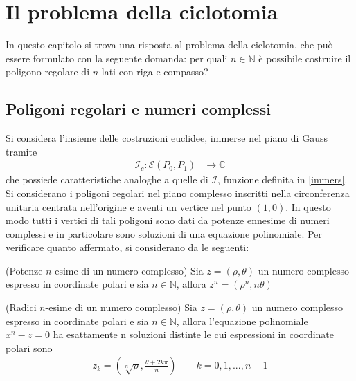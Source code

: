 
\chapter{Il problema della ciclotomia}

In questo capitolo si trova una risposta al problema della ciclotomia, che può essere formulato con la seguente domanda: per quali $n \in \mathbb{N}$ è possibile costruire il poligono regolare di $n$ lati con riga e compasso?


\section{Poligoni regolari e numeri complessi}

Si considera l'insieme delle costruzioni euclidee, immerse nel piano di Gauss tramite
\begin{align*} \label{immersc}
\mathcal{I}_c:  \mathcal{E}(P_0,P_1) & \longrightarrow \mathbb{C} 
\end{align*}
che possiede caratteristiche analoghe a quelle di $\mathcal{I}$, funzione definita in \ref{immers}.
Si considerano i poligoni regolari nel piano complesso inscritti nella circonferenza unitaria centrata nell'origine e aventi un vertice nel punto $(1,0)$. In questo modo tutti i vertici di tali poligoni sono dati da potenze ennesime di numeri complessi e in particolare sono soluzioni di una equazione polinomiale.
Per verificare quanto affermato, si considerano da \cite{Rogg} le seguenti:

\begin{prop}(Potenze $n$-esime di un numero complesso) \label{potcompl}
Sia $z = (\rho, \theta)$ un numero complesso espresso in coordinate polari e sia $n \in \mathbb{N}$, allora $z^n = (\rho^n, n\theta)$
\end{prop}

\begin{prop}(Radici $n$-esime di un numero complesso) \label{radcompl}
Sia $z = (\rho, \theta)$ un numero complesso espresso in coordinate polari e sia $n \in \mathbb{N}$, allora l'equazione polinomiale $x^n - z = 0$ ha esattamente n soluzioni distinte le cui espressioni in coordinate polari sono 
\begin{align*} 
z_k = (\sqrt[n]{\rho} , \frac{\theta + 2k\pi}{n}) \qquad k = 0, 1, ... , n-1
\end{align*}
\end{prop}

